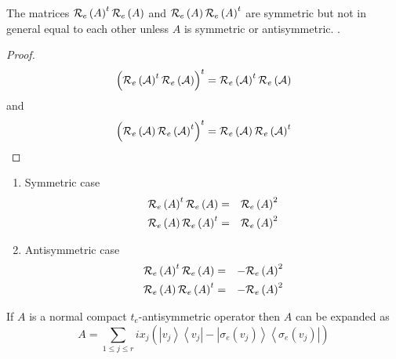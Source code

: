 \begin{lemma}
The matrices ${\cal R}_{e}\left( A\right) ^{t}{\cal R}_{e}\left( A\right) $
and ${\cal R}_{e}\left( A\right) {\cal R}_{e}\left( A\right) ^{t}$ are
symmetric but not in general equal to each other unless $A$ is symmetric or
antisymmetric. .

\begin{proof}
\begin{equation}
\left( {\cal R}_{e}\left( {\cal A}\right) ^{t}{\cal R}_{e}\left( {\cal A}%
\right) \right) ^{t}={\cal R}_{e}\left( {\cal A}\right) ^{t}{\cal R}%
_{e}\left( {\cal A}\right) 
\end{equation}%
and 
\begin{equation}
\left( {\cal R}_{e}\left( {\cal A}\right) {\cal R}_{e}\left( {\cal A}\right)
^{t}\right) ^{t}={\cal R}_{e}\left( {\cal A}\right) {\cal R}_{e}\left( {\cal %
A}\right) ^{t}
\end{equation}
\end{proof}

\begin{enumerate}
\item Symmetric case 
\begin{eqnarray}
{\cal R}_{e}\left( A\right) ^{t}{\cal R}_{e}\left( A\right) &=&{\cal R}%
_{e}\left( A\right) ^{2} \\
{\cal R}_{e}\left( A\right) {\cal R}_{e}\left( A\right) ^{t} &=&{\cal R}%
_{e}\left( A\right) ^{2}
\end{eqnarray}

\item Antisymmetric case 
\begin{eqnarray}
{\cal R}_{e}\left( A\right) ^{t}{\cal R}_{e}\left( A\right) &=&-{\cal R}%
_{e}\left( A\right) ^{2} \\
{\cal R}_{e}\left( A\right) {\cal R}_{e}\left( A\right) ^{t} &=&-{\cal R}%
_{e}\left( A\right) ^{2}
\end{eqnarray}
\end{enumerate}
\end{lemma}

\begin{lemma}
If $A$ is a normal compact $t_{e}$-antisymmetric operator then $A$ can be
expanded as 
\begin{equation}
A=\sum_{1\leq j\leq r}ix_{j}\left( \stackrel{}{\left\vert v_{j}\right\rangle
\left\langle v_{j}\right\vert -\left\vert \sigma _{e}\left( v_{j}\right)
\right\rangle \left\langle \sigma _{e}\left( v_{j}\right) \right\vert }%
\right)
\end{equation}
\end{lemma}

